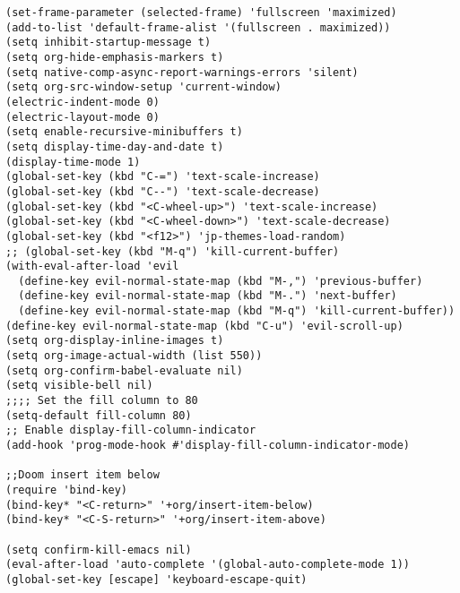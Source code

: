 \documentclass[11pt]{article}
\begin{document}
\begin{verbatim}
(set-frame-parameter (selected-frame) 'fullscreen 'maximized)
(add-to-list 'default-frame-alist '(fullscreen . maximized))
(setq inhibit-startup-message t)
(setq org-hide-emphasis-markers t)
(setq native-comp-async-report-warnings-errors 'silent)
(setq org-src-window-setup 'current-window)
(electric-indent-mode 0)
(electric-layout-mode 0)
(setq enable-recursive-minibuffers t)
(setq display-time-day-and-date t)
(display-time-mode 1)
(global-set-key (kbd "C-=") 'text-scale-increase)
(global-set-key (kbd "C--") 'text-scale-decrease)
(global-set-key (kbd "<C-wheel-up>") 'text-scale-increase)
(global-set-key (kbd "<C-wheel-down>") 'text-scale-decrease)
(global-set-key (kbd "<f12>") 'jp-themes-load-random)
;; (global-set-key (kbd "M-q") 'kill-current-buffer)
(with-eval-after-load 'evil
  (define-key evil-normal-state-map (kbd "M-,") 'previous-buffer)
  (define-key evil-normal-state-map (kbd "M-.") 'next-buffer)
  (define-key evil-normal-state-map (kbd "M-q") 'kill-current-buffer))
(define-key evil-normal-state-map (kbd "C-u") 'evil-scroll-up)
(setq org-display-inline-images t)
(setq org-image-actual-width (list 550))
(setq org-confirm-babel-evaluate nil)
(setq visible-bell nil)
;;;; Set the fill column to 80
(setq-default fill-column 80)
;; Enable display-fill-column-indicator
(add-hook 'prog-mode-hook #'display-fill-column-indicator-mode) 

;;Doom insert item below
(require 'bind-key)
(bind-key* "<C-return>" '+org/insert-item-below)
(bind-key* "<C-S-return>" '+org/insert-item-above)

(setq confirm-kill-emacs nil)
(eval-after-load 'auto-complete '(global-auto-complete-mode 1))
(global-set-key [escape] 'keyboard-escape-quit)


\end{verbatim}
\end{document}
